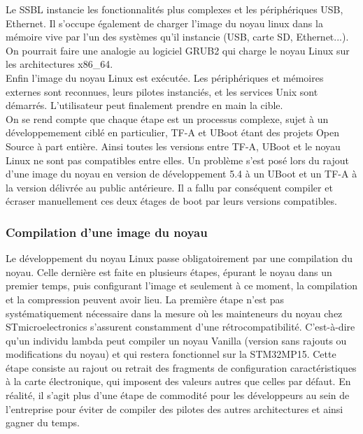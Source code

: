 Le SSBL instancie les fonctionnalités plus complexes et les périphériques USB,
Ethernet. Il s'occupe également de charger l'image du noyau linux dans la
mémoire vive par l'un des systèmes qu'il instancie (USB, carte SD,
Ethernet...). On pourrait faire une analogie au logiciel GRUB2 qui charge le
noyau Linux sur les architectures x86\_64. \\

Enfin l'image du noyau Linux est exécutée. Les périphériques et mémoires
externes sont reconnues, leurs pilotes instanciés, et les services Unix sont
démarrés. L'utilisateur peut finalement prendre en main la cible. \\

On se rend compte que chaque étape est un processus complexe, sujet à un
développemement ciblé en particulier, TF-A et UBoot étant des projets Open
Source à part entière. Ainsi toutes les versions entre TF-A, UBoot et le noyau
Linux ne sont pas compatibles entre elles. Un problème s'est posé lors du
rajout d'une image du noyau en version de développement 5.4 à un UBoot et un
TF-A à la version délivrée au public antérieure. Il a fallu par conséquent
compiler et écraser manuellement ces deux étages de boot par leurs versions
compatibles. 

\subsubsection{Compilation d'une image du noyau}
\label{sec:kernel_cumpilation}

Le développement du noyau Linux passe obligatoirement par une compilation du
noyau. Celle dernière est faite en plusieurs étapes, épurant le noyau dans un
premier temps, puis configurant l'image et seulement à ce moment, la
compilation et la compression peuvent avoir lieu. La première étape n'est pas
systématiquement nécessaire dans la mesure où les mainteneurs du noyau chez
STmicroelectronics s'assurent constamment d'une rétrocompatibilité.
C'est-à-dire qu'un individu lambda peut compiler un noyau Vanilla (version
sans rajouts ou modifications du noyau) et qui restera fonctionnel sur la
STM32MP15. Cette étape consiste au rajout ou retrait des fragments de
configuration caractéristiques à la carte électronique, qui imposent des
valeurs autres que celles par défaut. En réalité, il s'agit plus d'une étape
de commodité pour les développeurs au sein de l'entreprise pour éviter de
compiler des pilotes des autres architectures et ainsi gagner du temps. \\

